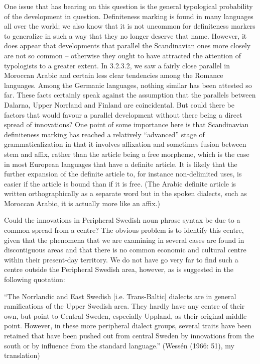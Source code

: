 One issue that has bearing on this question is the general typological probability of the development in question. Definiteness marking is found in many languages all over the world; we also know that it is not uncommon for definiteness markers to generalize in such a way that they no longer deserve that name. However, it does appear that developments that parallel the Scandinavian ones more closely are not so common – otherwise they ought to have attracted the attention of typologists to a greater extent. In 3.2.3.2, we saw a fairly close parallel in Moroccan Arabic and certain less clear tendencies among the Romance languages. Among the Germanic languages, nothing similar has been attested so far. These facts certainly speak against the assumption that the parallels between Dalarna, Upper Norrland and Finland are coincidental. But could there be factors that would favour a parallel development without there being a direct spread of innovations? One point of some importance here is that Scandinavian definiteness marking has reached a relatively “advanced” stage of grammaticalization in that it involves affixation and sometimes fusion between stem and affix, rather than the article being a free morpheme, which is the case in most European languages that have a definite article. It is likely that the further expansion of the definite article to, for instance non-delimited uses, is easier if the article is bound than if it is free. (The Arabic definite article is written orthographically as a separate word but in the spoken dialects, such as Moroccan Arabic, it is actually more like an affix.) 

Could the innovations in Peripheral Swedish noun phrase syntax be due to a common spread from a centre? The obvious problem is to identify this centre, given that the phenomena that we are examining in several cases are found in discontiguous areas and that there is no common economic and cultural centre within their present-day territory. We do not have go very far to find such a centre outside the Peripheral Swedish area, however, as is suggested in the following quotation: 

“The Norrlandic and East Swedish [i.e. Trans-Baltic] dialects are in general ramifications of the Upper Swedish area. They hardly have any centre of their own, but point to Central Sweden, especially Uppland, as their original middle point. However, in these more peripheral dialect groups, several traits have been retained that have been pushed out from central Sweden by innovations from the south or by influence from the standard language.” (Wessén (1966: 51), my translation)

